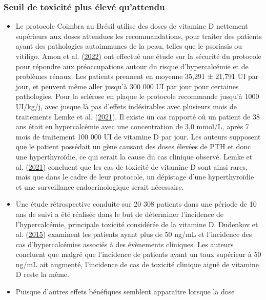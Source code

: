 \documentclass[
  letterpaper,
  DIV=11,
  numbers=noendperiod]{scrartcl}
\begin{document}
\hypertarget{seuil-de-toxicituxe9-plus-uxe9levuxe9-quattendu}{%
\subsubsection{Seuil de toxicité plus élevé
qu'attendu}\label{seuil-de-toxicituxe9-plus-uxe9levuxe9-quattendu}}

\begin{itemize}
\item
  Le protocole Coimbra au Brésil utilise des doses de vitamine D
  nettement supérieurs aux doses attendues les recommandations, pour
  traiter des patients ayant des pathologies autoimmunes de la peau,
  telles que le psoriasis ou vitiligo. Amon et al.
  (\protect\hyperlink{ref-Amon.2022}{2022}) ont effectué une étude sur
  la sécurité du protocole pour répondre aux préoccupations autour du
  risque d'hypercalcémie et de problèmes rénaux. Les patients prennent
  en moyenne 35,291 ± 21,791 UI par jour, et peuvent même aller jusqu'à
  300 000 UI par jour pour certaines pathologies. Pour la sclérose en
  plaque le protocole recommande jusqu'à 1000 UI/kg/j, avec jusque là
  pas d'effets indésirables avec plusieurs mois de traitements Lemke et
  al. (\protect\hyperlink{ref-Lemke.2021}{2021}). Il existe un cas
  rapporté où un patient de 38 ans était en hypercalcémie avec une
  concentration de 3,0 mmol/L, après 7 mois de traitement 100 000 UI de
  vitamine D par jour. Les auteurs supposent que le patient possédait un
  gène causant des doses élevées de PTH et donc une hyperthyroïdie, ce
  qui serait la cause du cas clinique observé. Lemke et al.
  (\protect\hyperlink{ref-Lemke.2021}{2021}) concluent que les cas de
  toxicité de vitamine D sont ainsi rares, mais que dans le cadre de
  leur protocole, un dépistage d'une hyperthyroïdie et une surveillance
  endocrinologique serait nécessaire.
\item
  Une étude rétrospective conduite sur 20 308 patients dans une période
  de 10 ans de suivi a été réalisée dans le but de déterminer
  l'incidence de l'hypercalcémie, principale toxicité considérée de la
  vitamine D. Dudenkov et al.
  (\protect\hyperlink{ref-Dudenkov.2015}{2015}) examinent les patients
  ayant plus de 50 ng/mL et l'incidence des cas d'hypercalcémies
  associés à des évènements cliniques. Les auteurs concluent que malgré
  que l'incidence de patients ayant un taux supérieur à 50 ng/mL ait
  augmenté, l'incidence de cas de toxicité clinique aiguë de vitamine D
  reste la même.
\item
  Puisque d'autres effets bénéfiques semblent apparaître lorsque la dose

\end{itemize}
\end{document}
